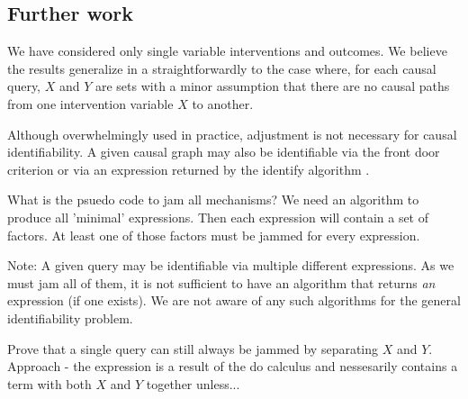 \documentclass{article}
\theoremstyle{plain}
\theoremstyle{definition}
\begin{document}
\subsection{Further work}

We have considered only single variable interventions and outcomes. We believe the results generalize in a straightforwardly to the case where, for each causal query, $X$ and $Y$ are sets with a minor assumption that there are no causal paths from one intervention variable $X$ to another.

Although overwhelmingly used in practice, adjustment is not necessary for causal identifiability. A given causal graph may also be identifiable via the front door criterion \cite{} or via an expression returned by the identify algorithm \cite{}. 

What is the psuedo code to jam all mechanisms? We need an algorithm to produce all 'minimal' expressions. Then each expression will contain a set of factors. At least one of those factors must be jammed for every expression. 

Note: A given query may be identifiable via multiple different expressions. As we must jam all of them, it is not sufficient to have an algorithm that returns \textit{an} expression (if one exists). We are not aware of any such algorithms for the general identifiability problem. 

Prove that a single query can still always be jammed by separating $X$ and $Y$. Approach  - the expression is a result of the do calculus and nessesarily contains a term with both $X$ and $Y$ together unless... 



\end{document}
